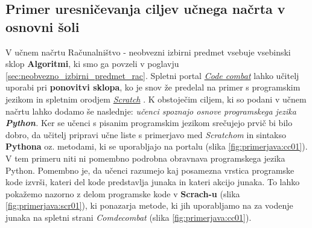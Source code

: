 \subsection{Primer uresničevanja ciljev učnega načrta v osnovni šoli}
\label{sec:uresn-cilj-unega-os}

V učnem načrtu Računalništvo - neobvezni izbirni predmet
\cite{ucni_nacrt-neobvezni-izbirni-os} vsebuje vsebinski sklop
\textbf{Algoritmi}, ki smo ga povzeli v poglavju
\ref{sec:neobvezno_izbirni_predmet_rac}. Spletni portal
\emph{\href{https://codecombat.com/}{Code combat}}
\cite{web:codecombat} lahko učitelj uporabi pri\textbf{ ponovitvi
  sklopa}, ko je snov že predelal na primer s programskim jezikom in
spletnim orodjem \emph{\href{https://scratch.mit.edu/}{Scratch}}
\cite{web:scratch}. K obstoječim ciljem, ki so podani v učnem načrtu
lahko dodamo še naslednje: \emph{učenci spoznajo osnove programskega
  jezika \textbf{Python}.}  Ker se učenci s pisanim programskim
jezikom srečujejo prvič bi bilo dobro, da učitelj pripravi učne liste
s primerjavo med \emph{Scratchom} in sintakso \textbf{Pythona}
oz. metodami, ki se uporabljajo na portalu (slika
\ref{fig:primerjava:cc01}). V tem primeru niti ni pomembno podrobna
obravnava programskega jezika Python. Pomembno je, da učenci razumejo
kaj posamezna vrstica programske kode izvrši, kateri del kode
predstavlja junaka in kateri akcijo junaka. To lahko pokažemo nazorno
z delom programske kode v \textbf{Scrach-u} (slika
\ref{fig:primerjava:scr01}), ki ponazarja metode, ki jih uporabljamo
na za vodenje junaka na spletni strani \emph{Comdecombat} (slika
\ref{fig:primerjava:cc01}).

